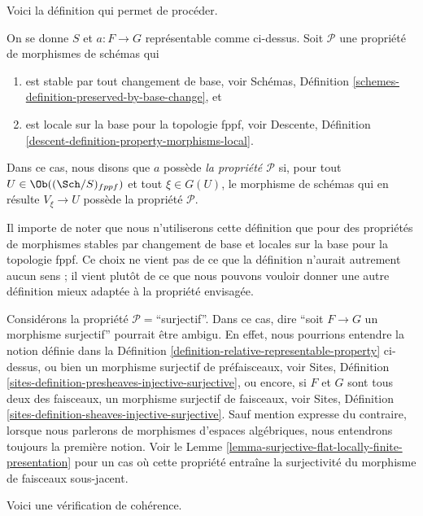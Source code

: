 \noindent
Voici la définition qui permet de procéder.

\begin{definition}
\label{definition-relative-representable-property}
On se donne $S$ et $a : F \to G$ représentable comme ci-dessus.
Soit $\mathcal{P}$ une propriété de morphismes de schémas qui
\begin{enumerate}
\item est stable par tout changement de base,
voir Schémas, Définition \ref{schemes-definition-preserved-by-base-change},
et
\item est locale sur la base pour la topologie fppf, voir
Descente, Définition \ref{descent-definition-property-morphisms-local}.
\end{enumerate}
Dans ce cas, nous disons que $a$ possède {\it la propriété $\mathcal{P}$} si, pour tout
$U \in \Ob((\Sch/S)_{fppf})$ et
tout $\xi \in G(U)$, le morphisme de schémas qui en résulte
$V_\xi \to U$ possède la propriété $\mathcal{P}$.
\end{definition}

\noindent
Il importe de noter que nous n'utiliserons cette définition que pour
des propriétés de morphismes stables par changement de base et
locales sur la base pour la topologie fppf. Ce choix ne vient
pas de ce que la définition n'aurait autrement aucun sens ; il vient plutôt
de ce que nous pouvons vouloir donner une autre définition
mieux adaptée à la propriété envisagée.

\begin{remark}
\label{remark-warning}
Considérons la propriété $\mathcal{P}=$``surjectif''.
Dans ce cas, dire
``soit $F \to G$ un morphisme surjectif'' pourrait être ambigu.
En effet, nous pourrions entendre la notion définie
dans la Définition \ref{definition-relative-representable-property}
ci-dessus, ou bien un morphisme surjectif de préfaisceaux, voir
Sites, Définition \ref{sites-definition-presheaves-injective-surjective},
ou encore, si $F$ et $G$ sont tous deux des faisceaux,
un morphisme surjectif de faisceaux, voir
Sites, Définition \ref{sites-definition-sheaves-injective-surjective}.
Sauf mention expresse du contraire, lorsque nous parlerons de morphismes d'espaces algébriques,
nous entendrons toujours la première notion. Voir le
Lemme \ref{lemma-surjective-flat-locally-finite-presentation}
pour un cas où cette propriété entraîne la surjectivité du morphisme de faisceaux sous-jacent.
\end{remark}

\noindent
Voici une vérification de cohérence.

